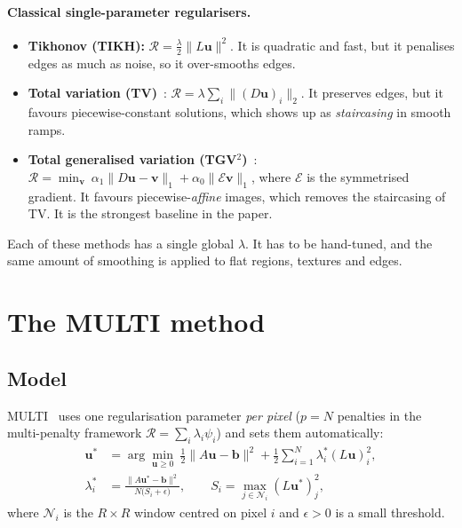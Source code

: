 \paragraph{Classical single-parameter regularisers.}
\begin{itemize}[leftmargin=*,itemsep=1pt]
\item \textbf{Tikhonov (TIKH):} $\mathcal R=\frac{\lambda}{2}\|L\mathbf u\|^2$.
  It is quadratic and fast, but it penalises edges as much as noise, so it
  over-smooths edges.
\item \textbf{Total variation (TV)}~\cite{rof}: $\mathcal R=\lambda\sum_i\|(D\mathbf u)_i\|_2$.
  It preserves edges, but it favours piecewise-constant solutions, which shows up as
  \emph{staircasing} in smooth ramps.
\item \textbf{Total generalised variation (TGV$^2$)}~\cite{tgv}:
  $\mathcal R=\min_{\mathbf v}\ \alpha_1\|D\mathbf u-\mathbf v\|_{1}+\alpha_0\|\mathcal E\mathbf v\|_{1}$,
  where $\mathcal E$ is the symmetrised gradient. It favours piecewise-\emph{affine}
  images, which removes the staircasing of TV. It is the strongest baseline in the paper.
\end{itemize}
Each of these methods has a single global $\lambda$. It has to be hand-tuned, and
the same amount of smoothing is applied to flat regions, textures and edges.

\section{The MULTI method}
\label{sec:multi}

\subsection{Model}
MULTI~\cite{multi} uses one regularisation parameter \emph{per pixel}
($p=N$ penalties in the multi-penalty framework
$\mathcal R=\sum_i\lambda_i\psi_i$) and sets them automatically:
\begin{equation}
\begin{aligned}
\mathbf u^{*} &= \arg\min_{\mathbf u\ge 0}\ \tfrac12\|A\mathbf u-\mathbf b\|^2
     + \tfrac12\sum_{i=1}^{N}\lambda_i^{*}(L\mathbf u)_i^2, \\
\lambda_i^{*} &= \frac{\|A\mathbf u^{*}-\mathbf b\|^2}{N\big(S_i+\epsilon\big)},
\qquad S_i=\max_{j\in\mathcal N_i}(L\mathbf u^{*})_j^2 ,
\end{aligned}
\label{eq:multi}
\end{equation}
where $\mathcal N_i$ is the $R\times R$ window centred on pixel $i$ and
$\epsilon>0$ is a small threshold.

